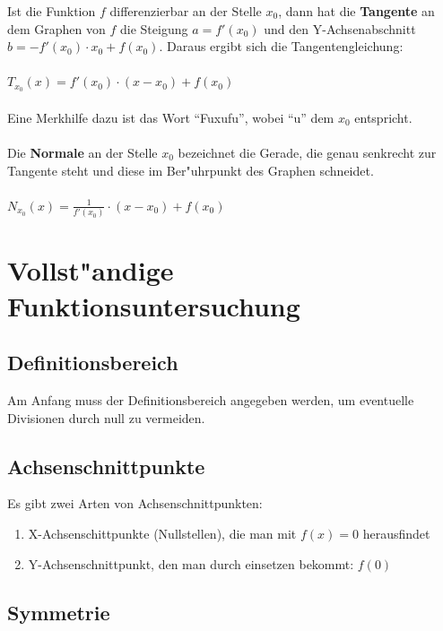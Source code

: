 Ist die Funktion $f$ differenzierbar an der Stelle $x_{0}$, dann hat die \textbf{Tangente} an dem Graphen von $f$ die Steigung $a=f'(x_{0})$ und den Y-Achsenabschnitt $b=-f'(x_{0})\cdot x_{0}+f(x_{0})$. Daraus ergibt sich die Tangentengleichung:\\
\\
$T_{x_{0}}(x)=f'(x_{0})\cdot (x-x_{0})+f(x_{0}) $ \\
\\
Eine Merkhilfe dazu ist das Wort "`Fuxufu"', wobei "`u"' dem $x_{0}$ entspricht.\\
\\
Die \textbf{Normale} an der Stelle $x_{0}$ bezeichnet die Gerade, die genau senkrecht zur Tangente steht und diese im Ber"uhrpunkt des Graphen schneidet.\\
\\
$N_{x_{0}}(x)=\frac{1}{f'(x_{0})}\cdot (x-x_{0})+f(x_{0})$\\


\section{Vollst"andige Funktionsuntersuchung}


\subsection{Definitionsbereich}

Am Anfang muss der Definitionsbereich angegeben werden, um eventuelle Divisionen durch null zu vermeiden. \\


\subsection{Achsenschnittpunkte}

Es gibt zwei Arten von Achsenschnittpunkten:
\begin{enumerate}
\item X-Achsenschittpunkte (Nullstellen), die man mit $f(x)=0$ herausfindet
\item Y-Achsenschnittpunkt, den man durch einsetzen bekommt: $f(0)$ \\
\end{enumerate}

\subsection{Symmetrie}

